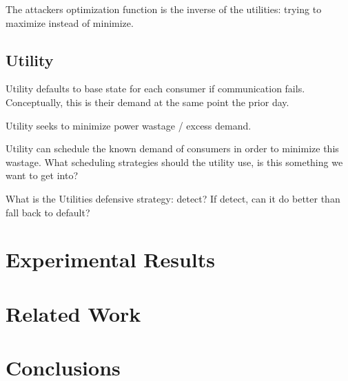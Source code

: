 \documentclass[conference]{IEEEtran}
\begin{document}
The attackers optimization function is the inverse of the utilities: trying to maximize instead of minimize.

\subsection{Utility}

Utility defaults to base state for each consumer if communication fails.  Conceptually, this is their demand at the same 
point the prior day.

Utility seeks to minimize power wastage / excess demand.

Utility can schedule the known demand of consumers in order to minimize this wastage.  What scheduling strategies
should the utility use, is this something we want to get into?

What is the Utilities defensive strategy: detect? If detect, can it do better than fall back to default?

\section{Experimental Results}
\section{Related Work}
\section{Conclusions}
\end{document}
